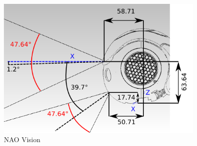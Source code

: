 \begin{figure}
	[h] \centering 
	\includegraphics[height=7cm]{figures/content/nao-vision.png} \caption{NAO Vision} \label{fg:nao:vision} 
\end{figure}
